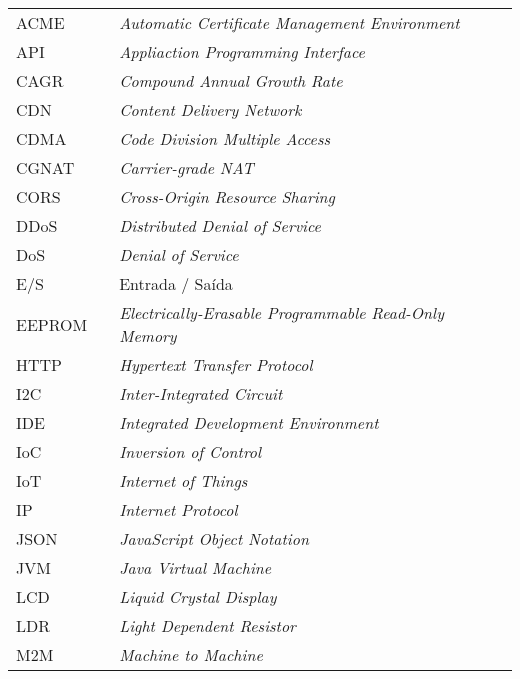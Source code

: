 \begin{table}[H]
\centering
\label{my-label}
\begin{tabular}{lll}
ACME  &  & \textit{Automatic Certificate Management Environment}     \\
API   &  & \textit{Appliaction Programming Interface}                \\
CAGR  &  & \textit{Compound Annual Growth Rate}                      \\
CDN   &  & \textit{Content Delivery Network}                         \\
CDMA  &  & \textit{Code Division Multiple Access}                    \\
CGNAT &  & \textit{Carrier-grade NAT}                                \\
CORS  &  & \textit{Cross-Origin Resource Sharing}                    \\
DDoS   &  & \textit{Distributed Denial of Service}                   \\
DoS   &  & \textit{Denial of Service}                                \\
E/S   &  & Entrada / Saída                                           \\
EEPROM & & \textit{Electrically-Erasable Programmable Read-Only Memory} \\
HTTP  &  & \textit{Hypertext Transfer Protocol}                      \\
I2C   &  & \textit{Inter-Integrated Circuit}                         \\
IDE   &  & \textit{Integrated Development Environment}               \\
IoC   &  & \textit{Inversion of Control}                             \\
IoT   &  & \textit{Internet of Things}                               \\
IP    &  & \textit{Internet Protocol}                                \\
JSON  &  & \textit{JavaScript Object Notation}                       \\
JVM   &  & \textit{Java Virtual Machine}                             \\
LCD   &  & \textit{Liquid Crystal Display}                           \\
LDR   &  & \textit{Light Dependent Resistor}                         \\
M2M   &  & \textit{Machine to Machine}                               \\

\end{tabular}
\end{table}
